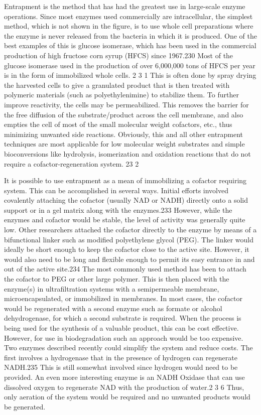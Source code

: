 \begin{refsection}
Entrapment is the method that has had the greatest use in large-scale enzyme
operations. Since most enzymes used commercially are intracellular, the
simplest method, which is not shown in the figure, is to use whole cell
preparations where the enzyme is never released from the bacteria in which it
is produced. One of the best examples of this is glucose isomerase, which has
been used in the commercial production of high fructose corn syrup (HFCS) since
1967.230 Most of the glucose isomerase used in the production of over 6,000,000
tons of HFCS per year is in the form of immobilized whole cells. 2 3 1 This is
often done by spray drying the harvested cells to give a granulated product
that is then treated with polymeric materials (such as polyethylenimine) to
stabilize them. To further improve reactivity, the cells may be permeabilized.
This removes the barrier for the free diffusion of the substrate/product across
the cell membrane, and also empties the cell of most of the small molecular
weight cofactors, etc., thus minimizing unwanted side reactions. Obviously,
this and all other entrapment techniques are most applicable for low molecular
weight substrates and simple bioconversions like hydrolysis, isomerization and
oxidation reactions that do not require a cofactor-regeneration system. 23 2

It is possible to use entrapment as a mean of immobilizing a cofactor requiring
system. This can be accomplished in several ways. Initial efforts involved
covalently attaching the cofactor (usually NAD or NADH) directly onto a solid
support or in a gel matrix along with the enzymes.233 However, while the
enzymes and cofactor would be stable, the level of activity was generally quite
low. Other researchers attached the cofactor directly to the enzyme by means of
a bifunctional linker such as modified polyethylene glycol (PEG). The linker
would ideally be short enough to keep the cofactor close to the active site.
However, it would also need to be long and flexible enough to permit its easy
entrance in and out of the active site.234 The most commonly used method has
been to attach the cofactor to PEG or other large polymer. This is then placed
with the enzyme(s) in ultrafiltration systems with a semipermeable membrane,
microencapsulated, or immobilized in membranes. In most cases, the cofactor
would be regenerated with a second enzyme such as formate or alcohol
dehydrogenase, for which a second substrate is required. When the process is
being used for the synthesis of a valuable product, this can be cost effective.
However, for use in biodegradation such an approach would be too expensive. Two
enzymes described recently could simplify the system and reduce costs. The
first involves a hydrogenase that in the presence of hydrogen can regenerate
NADH.235 This is still somewhat involved since hydrogen would need to be
provided. An even more interesting enzyme is an NADH Oxidase that can use
dissolved oxygen to regenerate NAD with the production of water.2 3 6 Thus,
only aeration of the system would be required and no unwanted products would be
generated.


\end{refsection}
